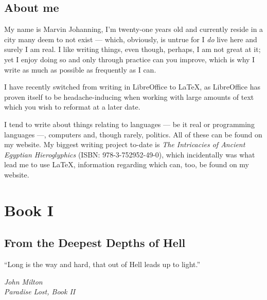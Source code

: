 \documentclass[a5paper,twoside,12pt]{report}
\begin{document}
\newpage

\chapter*{About me}

  My name is Marvin Johanning, I'm twenty-one years old and currently reside in a city many deem to not exist — which, obviously, is untrue for I \textit{do} live here and surely I am real. I like writing things, even though, perhaps, I am not great at it; yet I enjoy doing so and only through practice can you improve, which is why I write as much as possible as frequently as I can.

  I have recently switched from writing in LibreOffice to \LaTeX, as LibreOffice has proven itself to be headache-inducing when working with large amounts of text which you wish to reformat at a later date. 

  I tend to write about things relating to languages — be it real or programming languages —, computers and, though rarely, politics. All of these can be found on my website. My biggest writing project to-date is \textit{The Intricacies of Ancient Egyptian Hieroglyphics} (ISBN: 978-3-752952-49-0), which incidentally was what lead me to use \LaTeX, information regarding which can, too, be found on my website.
  \newpage


\thispagestyle{empty}
  \mbox{}
  \newpage

\part*{Book I}
  \newpage

\thispagestyle{empty}
  \mbox{}
  \newpage

\chapter*{From the Deepest Depths of Hell}

\epigraph{``Long is the way and hard, that out of Hell leads up to light.''}{\textit{John Milton\\Paradise Lost, Book II}}
\end{document}
